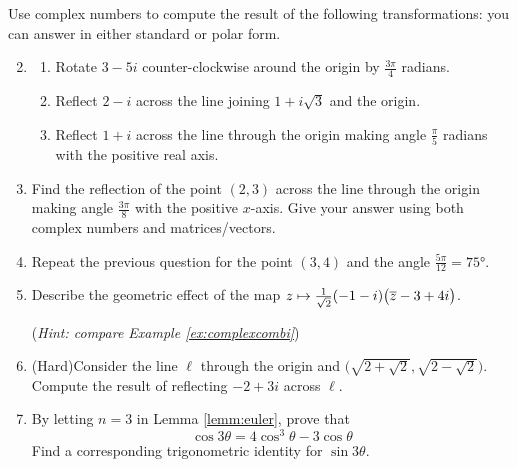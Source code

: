 \begin{exercises}
	\exstart Use complex numbers to compute the result of the following transformations: you can answer in either standard or polar form.
	\begin{enumerate}\setcounter{enumi}{1}
	  \item[]\begin{enumerate}
	    \item Rotate $3-5i$ counter-clockwise around the origin by $\frac{3\pi}4$ radians.
	    \item Reflect $2-i$ across the line joining $1+i\sqrt 3$ and the origin.
	    \item Reflect $1+i$ across the line through the origin making angle $\frac\pi 5$ radians with the positive real axis.
	  \end{enumerate}
	  
	  
	  
	  \item Find the reflection of the point $(2,3)$ across the line through the origin making angle $\frac{3\pi}8$ with the positive $x$-axis. Give your answer using both complex numbers and matrices/vectors.
	  
	  
		\item Repeat the previous question for the point $(3,4)$ and the angle $\frac{5\pi}{12}=\ang{75}$.
	  
	  
	  \item Describe the geometric effect of the map $z\mapsto \frac 1{\sqrt 2}(-1-i)\bigl(\overline{z}-3+4i\bigr)$.\par
	  (\emph{Hint: compare Example \ref{ex:complexcombi}})
	  
	  
	  \item (Hard)\lstsp Consider the line $\ell$ through the origin and $\bigl(\sqrt{2+\sqrt 2},\sqrt{2-\sqrt 2}\bigr)$. Compute the result of reflecting $-2+3i$ across $\ell$.
	    
	      
	  \item By letting $n=3$ in Lemma \ref{lemm:euler}, prove that 
	  	\[\cos 3\theta=4\cos^3\!\theta-3\cos\theta\]
	  	Find a corresponding trigonometric identity for $\sin 3\theta$.
	  	

\end{enumerate}
\end{exercises}
